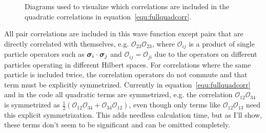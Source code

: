 \begin{figure}[h]
   \caption{Diagrams used to visualize which correlations are included in the quadratic correlations in equation~\ref{equ:fullquadcorr}.}
   \label{fig:quaddiagrams}
\end{figure}
All pair correlations are included in this wave function except pairs that are directly correlated with themselves, e.g. $\mathcal{O}_{23}\mathcal{O}_{23}$, where $\mathcal{O}_{ij}$ is a product of single particle operators such as $\bm{\sigma}_i\cdot\bm{\sigma}_j$ and $\mathcal{O}_{ij}=\mathcal{O}_{ji}$ due to the operators on different particles operating in different Hilbert spaces. For correlations where the same particle is included twice, the correlation operators do not commute and that term must be explicitly symmetrized. Currently in equation~\ref{equ:fullquadcorr} and in the code all quadratic terms are symmetrized, e.g. the correlation $\mathcal{O}_{12}\mathcal{O}_{34}$ is symmetrized as $\frac{1}{2}\left(\mathcal{O}_{12}\mathcal{O}_{34}+\mathcal{O}_{34}\mathcal{O}_{12}\right)$, even though only terms like $\mathcal{O}_{12}\mathcal{O}_{13}$ need this explicit symmetrization. This adds needless calculation time, but as I'll show, these terms don't seem to be significant and can be omitted completely.

